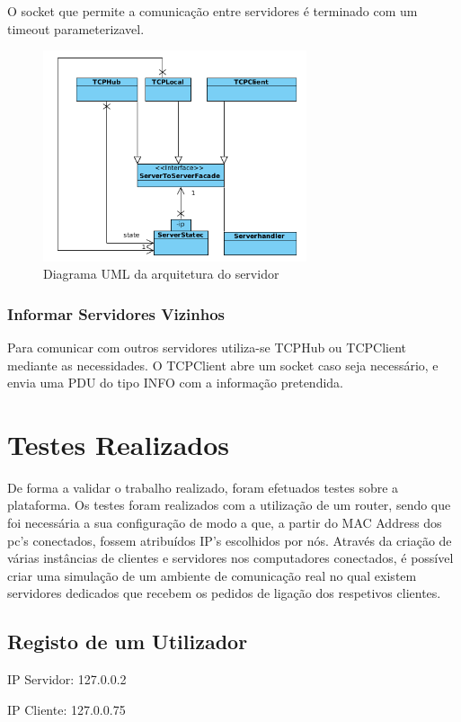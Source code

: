 \documentclass[runningheads,a4paper]{llncs}
\begin{document}
O socket que permite a comunicação entre servidores é terminado com um timeout parameterizavel.

\begin{figure}
\centering
\includegraphics[height=6.2cm]{facades.png}
\caption{Diagrama UML da arquitetura do servidor}
\label{fig:diagram-facades}
\end{figure}


\subsubsection{Informar Servidores Vizinhos}

Para comunicar com outros servidores utiliza-se TCPHub ou TCPClient mediante as necessidades.
O TCPClient abre um socket caso seja necessário, e envia uma PDU do tipo INFO com a informação pretendida.

\section{Testes Realizados}

De forma a validar o trabalho realizado, foram efetuados testes sobre a plataforma. Os testes foram realizados com a utilização de um router, sendo que foi necessária a sua configuração de modo a que, a partir do MAC Address dos pc’s conectados, fossem atribuídos IP’s escolhidos por nós. Através da criação de várias instâncias de clientes e servidores nos computadores conectados, é possível criar uma simulação de um ambiente de comunicação real no qual existem servidores dedicados que recebem os pedidos de ligação dos respetivos clientes.

\subsection{Registo de um Utilizador}

\begin{itemsize}

\item IP Servidor: 127.0.0.2
\item IP Cliente: 127.0.0.75

\end{itemsize}
\end{document}
